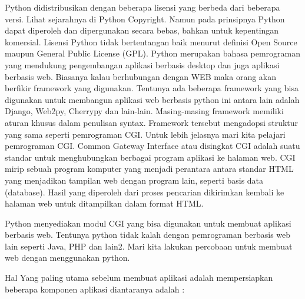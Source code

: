 Python didistribusikan dengan beberapa lisensi yang berbeda dari beberapa versi. Lihat sejarahnya di Python Copyright. Namun pada prinsipnya Python dapat diperoleh dan dipergunakan secara bebas, bahkan untuk kepentingan komersial. Lisensi Python tidak bertentangan baik menurut definisi Open Source maupun General Public License (GPL).
Python merupakan bahasa pemrograman yang mendukung pengembangan aplikasi berbasis desktop dan juga aplikasi berbasis web. Biasanya kalau berhubungan dengan WEB maka orang akan berfikir framework yang digunakan. Tentunya ada beberapa framework yang bisa digunakan untuk membangun aplikasi web berbasis python ini antara lain adalah Django, Web2py, Cherrypy dan lain-lain. Masing-masing framework memiliki aturan khusus dalam penulisan syntax. Framework tersebut mengadopsi struktur yang sama seperti pemrograman CGI. Untuk lebih jelasnya mari kita pelajari pemrograman CGI. 
Common Gateway Interface atau disingkat CGI adalah suatu standar untuk menghubungkan berbagai program aplikasi ke halaman web. CGI mirip sebuah program komputer yang menjadi perantara antara standar HTML yang menjadikan tampilan web dengan program lain, seperti basis data (database). Hasil yang diperoleh dari proses pencarian dikirimkan kembali ke halaman web untuk ditampilkan dalam format HTML. \par
\vspace{12pt}
Python menyediakan modul CGI yang bisa digunakan untuk membuat aplikasi berbasis web. Tentunya python tidak kalah dengan pemrograman berbasis web lain seperti Java, PHP dan lain2. Mari kita lakukan percobaan untuk membuat web dengan menggunakan python. \par
\noindent 
Hal Yang paling utama sebelum membuat aplikasi adalah mempersiapkan beberapa komponen aplikasi diantaranya adalah : \par
\noindent 
